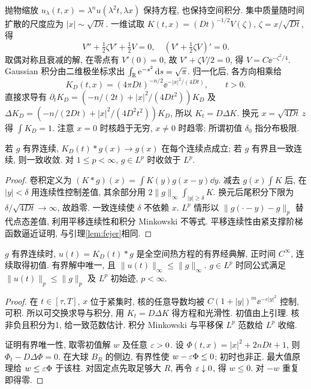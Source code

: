\label{ch:heatkernel}
抛物缩放 $u_\lambda(t,x)=\lambda^nu(\lambda^2t,\lambda x)$ 保持方程, 也保持空间积分. 集中质量随时间扩散的尺度应为 $|x|\sim\sqrt{Dt}$. 一维试取 $K(t,x)=(Dt)^{-1/2}V(\zeta)$, $\zeta=x/\sqrt{Dt}$, 得
\[
V''+\tfrac12\zeta V'+\tfrac12V=0,
\quad (V'+\tfrac12\zeta V)'=0.
\]
取偶对称且衰减的解, 在零点有 $V'(0)=0$, 故 $V'+\zeta V/2=0$, 得 $V=C\ee^{-\zeta^2/4}$. Gaussian 积分由二维极坐标求出 $\int_\mathbb R\mathrm e^{-s^2}\,\mathrm d s=\sqrt\pi$. 归一化后, 各方向相乘给
\begin{equation}\label{eq:heatkernel}
K_D(t,x)=(4\pi Dt)^{-n/2}\ee^{-|x|^2/(4Dt)},\qquad t>0.
\end{equation}
直接求导有 $\partial_tK_D=(-n/(2t)+|x|^2/(4Dt^2))K_D$ 及 $\Delta K_D=(-n/(2Dt)+|x|^2/(4D^2t^2))K_D$, 所以 $K_t=D\Delta K$. 换元 $x=\sqrt{4Dt}\,z$ 得 $\int K_D=1$. 注意 $x=0$ 时核趋于无穷, $x\ne0$ 时趋零; 所谓初值 $\delta_0$ 指分布极限.
\begin{lemma}\label{lem:heatapprox}
若 $g$ 有界连续, $K_D(t)*g(x)\to g(x)$ 在每个连续点成立; 若 $g$ 有界且一致连续, 则一致收敛. 对 $1\le p<\infty$, $g\in L^p$ 时收敛于 $L^p$.
\end{lemma}
\begin{proof}
卷积定义为 $(K*g)(x)=\int K(y)g(x-y)\dd y$. 减去 $g(x)\int K$ 后, 在 $|y|<\delta$ 用连续性控制差值, 其余部分用 $2\|g\|_\infty\int_{|y|\ge\delta}K$. 换元后尾积分下限为 $\delta/\sqrt{4Dt}\to\infty$, 故趋零. 一致连续使 $\delta$ 不依赖 $x$. $L^p$ 情形以 $\|g(\cdot-y)-g\|_p$ 替代点态差值, 利用平移连续性和积分 Minkowski 不等式. 平移连续性由紧支撑阶梯函数逼近证明, 与引理\ref{lem:fejer}相同.
\end{proof}
\begin{theorem}\label{thm:heatrn}
$g$ 有界连续时, $u(t)=K_D(t)*g$ 是全空间热方程的有界经典解, 正时间 $C^\infty$, 连续取得初值. 有界解中唯一, 且 $\|u(t)\|_\infty\le\|g\|_\infty$. $g\in L^p$ 时同公式满足 $\|u(t)\|_p\le\|g\|_p$ 及 $L^p$ 初始迹, $p<\infty$.
\end{theorem}
\begin{proof}
在 $t\in[\tau,T]$, $x$ 位于紧集时, 核的任意导数均被 $C(1+|y|)^m\ee^{-c|y|^2}$ 控制, 可积. 所以可交换求导与积分, 用 $K_t=D\Delta K$ 得方程和光滑性. 初值由上引理. 核非负且积分为1, 给一致范数估计. 积分 Minkowski 与平移保 $L^p$ 范数给 $L^p$ 收缩.

证明有界唯一性, 取零初值解 $w$ 及任意 $\varepsilon>0$. 设 $\Phi(t,x)=|x|^2+2nDt+1$, 则 $\Phi_t-D\Delta\Phi=0$. 在大球 $B_R$ 的侧边, 有界性使 $w-\varepsilon\Phi\le0$; 初时也非正. 最大值原理给 $w\le\varepsilon\Phi$ 于该柱. 对固定点先取足够大 $R$, 再令 $\varepsilon\downarrow0$, 得 $w\le0$. 对 $-w$ 重复即得零.
\end{proof}
